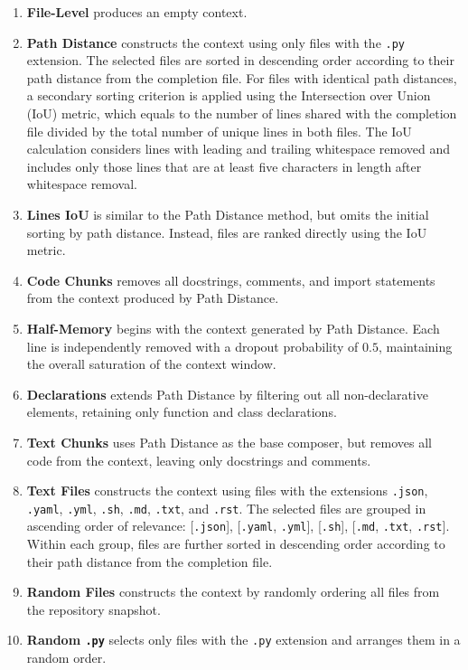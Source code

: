 \label{appendix:context-composers}
\begin{enumerate}
    \item \textbf{File-Level} produces an empty context.
    \item \textbf{Path Distance} constructs the context using only files with the \texttt{.py} extension. The selected files are sorted in descending order according to their path distance from the completion file. For files with identical path distances, a secondary sorting criterion is applied using the Intersection over Union (IoU) metric, which equals to the number of lines shared with the completion file divided by the total number of unique lines in both files. The IoU calculation considers lines with leading and trailing whitespace removed and includes only those lines that are at least five characters in length after whitespace removal.
    \item \textbf{Lines IoU} is similar to the Path Distance method, but omits the initial sorting by path distance. Instead, files are ranked directly using the IoU metric.
    \item \textbf{Code Chunks} removes all docstrings, comments, and import statements from the context produced by Path Distance.
    \item \textbf{Half-Memory} begins with the context generated by Path Distance. Each line is independently removed with a dropout probability of \(0.5\), maintaining the overall saturation of the context window.
    \item \textbf{Declarations} extends Path Distance by filtering out all non-declarative elements, retaining only function and class declarations.
    \item \textbf{Text Chunks} uses Path Distance as the base composer, but removes all code from the context, leaving only docstrings and comments.
    \item \textbf{Text Files} constructs the context using files with the extensions \texttt{.json}, \texttt{.yaml}, \texttt{.yml}, \texttt{.sh}, \texttt{.md}, \texttt{.txt}, and \texttt{.rst}. The selected files are grouped in ascending order of relevance: [\texttt{.json}], [\texttt{.yaml}, \texttt{.yml}], [\texttt{.sh}], [\texttt{.md}, \texttt{.txt}, \texttt{.rst}]. Within each group, files are further sorted in descending order according to their path distance from the completion file.
    \item \textbf{Random Files} constructs the context by randomly ordering all files from the repository snapshot.
    \item \textbf{Random \texttt{.py}} selects only files with the \texttt{.py} extension and arranges them in a random order.

\end{enumerate}
